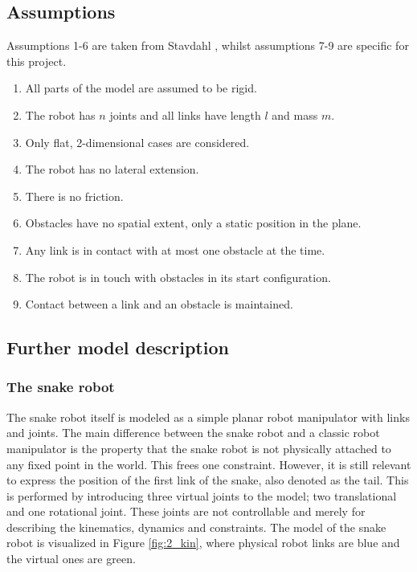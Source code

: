 \subsection{Assumptions}\label{seq:assumptions}

Assumptions 1-6 are taken from Stavdahl \cite{StavdahlNote}, whilst assumptions 7-9 are specific for this project.

\begin{enumerate}
    \item All parts of the model are assumed to be rigid.
    \item The robot has $n$ joints and all links have length $l$ and mass $m$.
    \item Only flat, 2-dimensional cases are considered.
    \item The robot has no lateral extension.
    \item There is no friction. 
    \item Obstacles have no spatial extent, only a static position in the plane.
    \item Any link is in contact with at most one obstacle at the time.
    \item The robot is in touch with obstacles in its start configuration.
    \item Contact between a link and an obstacle is maintained.
\end{enumerate}


\subsection{Further model description}

\subsubsection{The snake robot}
The snake robot itself is modeled as a simple planar robot manipulator with links and joints. The main difference between the snake robot and a classic robot manipulator is the property that the snake robot is not physically attached to any fixed point in the world. This frees one constraint. However, it is still relevant to express the position of the first link of the snake, also denoted as the tail. This is performed by introducing three virtual joints to the model; two translational and one rotational joint. These joints are not controllable and merely for describing the kinematics, dynamics and constraints. The model of the snake robot is visualized in Figure \ref{fig:2_kin}, where physical robot links are blue and the virtual ones are green.

